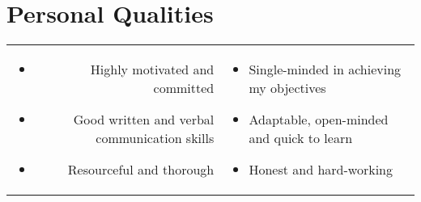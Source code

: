 \section*{Personal Qualities}

\begin{tabular}{rl}

\parbox[t]{0.5\textwidth}{
	\begin{itemize}
		\item Highly motivated and committed
		\item Good written and verbal communication skills
		\item Resourceful and thorough
	\end{itemize}
}

&

\parbox[t]{0.5\textwidth}{
	\begin{itemize}
		\item Single-minded in achieving my objectives
		\item Adaptable, open-minded and quick to learn
		\item Honest and hard-working
	\end{itemize}
}

\end{tabular}

